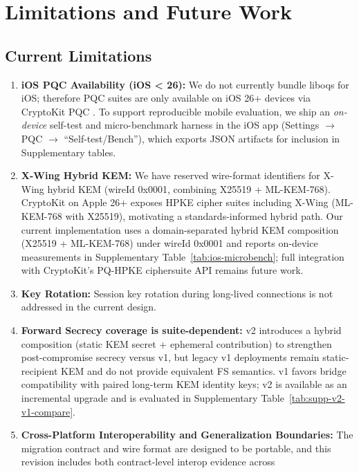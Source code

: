 \documentclass[10pt,journal,compsoc]{IEEEtran}
\begin{document}
\section{Limitations and Future Work}\label{sec:limitations}

\subsection{Current Limitations}\label{a.-current-limitations}

\begin{enumerate}
\item
  \textbf{iOS PQC Availability (iOS < 26):} We do not currently bundle
  liboqs for iOS; therefore PQC suites are only available on iOS 26+
  devices via CryptoKit PQC \cite{ref34}. To support reproducible mobile evaluation,
  we ship an \emph{on-device} self-test and micro-benchmark harness in the
  iOS app (Settings $\rightarrow$ PQC $\rightarrow$ ``Self-test/Bench''),
  which exports JSON artifacts for inclusion in Supplementary tables.
\item
  \textbf{X-Wing Hybrid KEM:} We have reserved wire-format identifiers
  for X-Wing hybrid KEM (wireId 0x0001, combining X25519 + ML-KEM-768).
  CryptoKit on Apple 26+ exposes HPKE cipher suites including X-Wing
  (ML-KEM-768 with X25519), motivating a standards-informed hybrid path.
  Our current implementation uses a domain-separated hybrid KEM
  composition (X25519 + ML-KEM-768) under wireId 0x0001 and reports
  on-device measurements in Supplementary Table~\ref{tab:ios-microbench}; full
  integration with CryptoKit's PQ-HPKE ciphersuite API remains future
  work.
\item
  \textbf{Key Rotation:} Session key rotation during long-lived
  connections is not addressed in the current design.
\item
  \textbf{Forward Secrecy coverage is suite-dependent:} v2 introduces a
  hybrid composition (static KEM secret + ephemeral contribution) to
  strengthen post-compromise secrecy versus v1, but legacy v1
  deployments remain static-recipient KEM and do not provide equivalent
  FS semantics. v1 favors bridge compatibility with paired long-term KEM
  identity keys; v2 is available as an incremental upgrade and is
  evaluated in Supplementary Table~\ref{tab:supp-v2-v1-compare}.
\item
  \textbf{Cross-Platform Interoperability and Generalization Boundaries:}
  The migration contract and wire format are designed to be portable,
  and this revision includes both contract-level interop evidence across

\end{enumerate}
\end{document}
